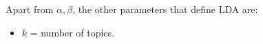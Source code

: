 \documentclass[10pt,conference]{IEEEtran}
\newcommand{\bi}{\begin{itemize}}
\newcommand{\ei}{\end{itemize}}
\newcommand{\be}{\begin{enumerate}}
\newcommand{\ee}{\end{enumerate}}
\theoremstyle{break}
\begin{document}
Apart from $\alpha,\beta$, the other parameters that define LDA
are:
\bi
\item $k$ = number of topics.
\ei


\begin{figure}[!t]
  
  


\scriptsize
\begin{center}
\begin{tabular}{c|c|c|c|c}
 

\end{tabular}
\end{center}
\end{figure}
\end{document}
